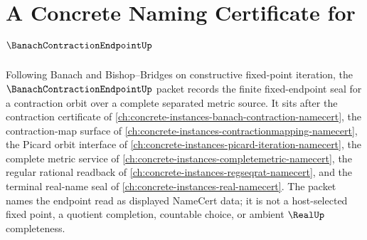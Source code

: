 \chapter{A Concrete Naming Certificate for $\BanachContractionEndpointUp$}
\label{ch:concrete-instances-banach-contraction-endpoint-namecert}

Following Banach and Bishop--Bridges on constructive fixed-point iteration, the $\BanachContractionEndpointUp$ packet records the finite fixed-endpoint seal for a contraction orbit over a complete separated metric source. It sits after the contraction certificate of \autoref{ch:concrete-instances-banach-contraction-namecert}, the contraction-map surface of \autoref{ch:concrete-instances-contractionmapping-namecert}, the Picard orbit interface of \autoref{ch:concrete-instances-picard-iteration-namecert}, the complete metric service of \autoref{ch:concrete-instances-completemetric-namecert}, the regular rational readback of \autoref{ch:concrete-instances-regseqrat-namecert}, and the terminal real-name seal of \autoref{ch:concrete-instances-real-namecert}. The packet names the endpoint read as displayed NameCert data; it is not a host-selected fixed point, a quotient completion, countable choice, or ambient $\RealUp$ completeness.


